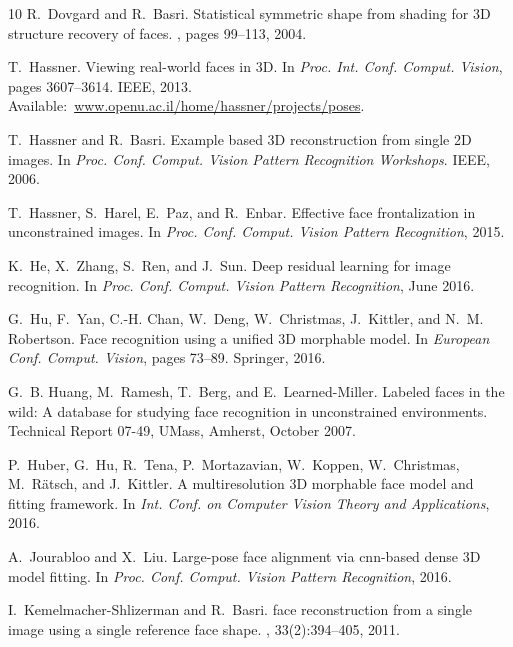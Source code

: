 \documentclass[10pt,twocolumn,letterpaper]{article}
\begin{document}
{\begin{thebibliography}{10}
R.~Dovgard and R.~Basri.
\newblock Statistical symmetric shape from shading for {3D} structure recovery
  of faces.
, pages 99--113, 2004.

T.~Hassner.
\newblock Viewing real-world faces in {3D}.
\newblock In {\em Proc. Int. Conf. Comput. Vision}, pages 3607--3614. IEEE,
  2013.
\newblock Available:~\url{www.openu.ac.il/home/hassner/projects/poses}.

T.~Hassner and R.~Basri.
\newblock Example based {3D} reconstruction from single {2D} images.
\newblock In {\em Proc. Conf. Comput. Vision Pattern Recognition Workshops}.
  IEEE, 2006.

T.~Hassner, S.~Harel, E.~Paz, and R.~Enbar.
\newblock Effective face frontalization in unconstrained images.
\newblock In {\em Proc. Conf. Comput. Vision Pattern Recognition}, 2015.

K.~He, X.~Zhang, S.~Ren, and J.~Sun.
\newblock Deep residual learning for image recognition.
\newblock In {\em Proc. Conf. Comput. Vision Pattern Recognition}, June 2016.

G.~Hu, F.~Yan, C.-H. Chan, W.~Deng, W.~Christmas, J.~Kittler, and N.~M.
  Robertson.
\newblock Face recognition using a unified {3D} morphable model.
\newblock In {\em European Conf. Comput. Vision}, pages 73--89. Springer, 2016.

G.~B. Huang, M.~Ramesh, T.~Berg, and E.~Learned-Miller.
\newblock Labeled faces in the wild: A database for studying face recognition
  in unconstrained environments.
\newblock Technical Report 07-49, UMass, Amherst, October 2007.

P.~Huber, G.~Hu, R.~Tena, P.~Mortazavian, W.~Koppen, W.~Christmas, M.~Rätsch,
  and J.~Kittler.
\newblock A multiresolution {3D} morphable face model and fitting framework.
\newblock In {\em Int. Conf. on Computer Vision Theory and Applications}, 2016.

A.~Jourabloo and X.~Liu.
\newblock Large-pose face alignment via cnn-based dense {3D} model fitting.
\newblock In {\em Proc. Conf. Comput. Vision Pattern Recognition}, 2016.

I.~Kemelmacher-Shlizerman and R.~Basri.
 face reconstruction from a single image using a single reference
  face shape.
, 33(2):394--405, 2011.


\end{thebibliography}}
\end{document}
